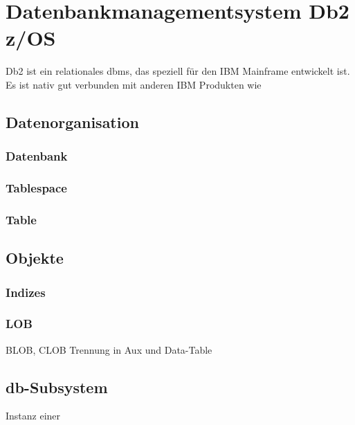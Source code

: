 \section[Db2]{Datenbankmanagementsystem Db2 z/OS}
Db2 ist ein relationales \ac{dbms}, das speziell für den IBM Mainframe entwickelt ist. Es ist nativ gut verbunden mit anderen IBM Produkten wie 

\subsection{Datenorganisation}

\subsubsection[\ac{db}]{Datenbank}

\subsubsection[\ac{ts}]{Tablespace}

\subsubsection[\ac{tb}]{Table}


\subsection{Objekte}

\subsubsection{Indizes}

\subsubsection{LOB}
BLOB, CLOB
Trennung in Aux und Data-Table


\subsection{\ac{db}-Subsystem}
Instanz einer 